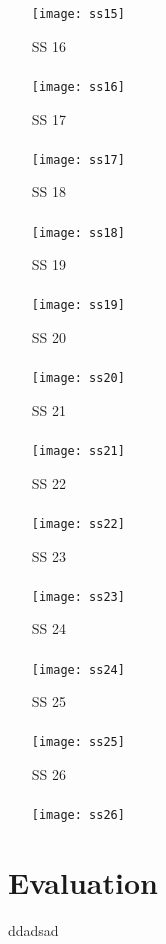 \documentclass[a4paper, 12pt, titlepage]{article}
\begin{document}
\begin{enumerate}
		\texttt{[image: ss15]}
	\item[SS]16\\\\ 
		\texttt{[image: ss16]}
	\item[SS]17\\\\ 
		\texttt{[image: ss17]}
	\item[SS]18\\\\ 
		\texttt{[image: ss18]}
	\item[SS]19\\\\ 
		\texttt{[image: ss19]}
	\item[SS]20\\\\ 
		\texttt{[image: ss20]}
	\item[SS]21\\\\ 
		\texttt{[image: ss21]}
	\item[SS]22\\\\ 
		\texttt{[image: ss22]}
	\item[SS]23\\\\ 
		\texttt{[image: ss23]}
	\item[SS]24\\\\ 
		\texttt{[image: ss24]}
	\item[SS]25\\\\ 
		\texttt{[image: ss25]}
	\item[SS]26\\\\ 
		\texttt{[image: ss26]}		
\end{enumerate}
\section{Evaluation}
ddadsad
\end{document}
